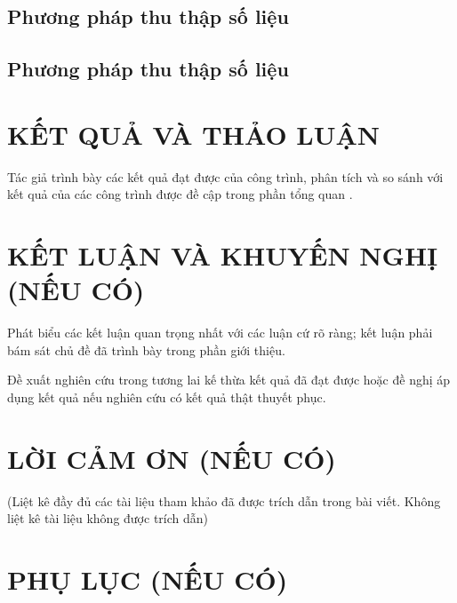 \documentclass[a4paper,journal,11pt]{IEEEtran}
\begin{document}
\subsection{Phương pháp thu thập số liệu}
\subsection{Phương pháp thu thập số liệu}
\section{KẾT QUẢ VÀ THẢO LUẬN}
Tác giả trình bày các kết quả đạt được của công trình, phân tích và so sánh với kết quả của các công trình được đề cập trong phần tổng quan \cite{cuong}.
\section{KẾT LUẬN VÀ KHUYẾN NGHỊ\\ (NẾU CÓ)}
Phát biểu các kết luận quan trọng nhất với các luận cứ rõ ràng; kết luận phải bám sát chủ đề đã trình bày trong phần giới thiệu.

Đề xuất nghiên cứu trong tương lai kế thừa kết quả đã đạt được hoặc đề nghị áp dụng kết quả nếu nghiên cứu có kết quả thật thuyết phục.
\section{LỜI CẢM ƠN (NẾU CÓ)}
\renewcommand\refname{\changefontsizes{10pt}TÀI LIỆU THAM KHẢO}


(Liệt kê đầy đủ các tài liệu tham khảo đã được trích dẫn trong bài viết. Không liệt kê tài liệu không được trích dẫn)
\section{PHỤ LỤC (NẾU CÓ)}
\end{document}
